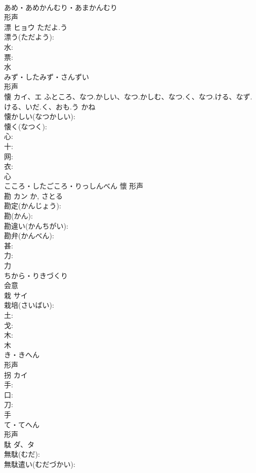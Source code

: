 \documentclass[8pt]{extreport}
\begin{document}
\begin{CJK}{UTF8}{min}
\\	あめ・あめかんむり・あまかんむり	
\\	形声 
\\	漂	ヒョウ	ただよ.う		
\\	漂う(ただよう): 
\\	水: 
\\	票: 
\\	水	
\\	みず・したみず・さんずい	
\\	形声 
\\	懐	カイ、エ	ふところ、なつ.かしい、なつ.かしむ、なつ.く、なつ.ける、なず.ける、いだ.く、おも.う	かね	
\\	懐かしい(なつかしい): 
\\	懐く(なつく): 
\\	心: 
\\	十: 
\\	网: 
\\	衣: 
\\	心	
\\	こころ・したごころ・りっしんべん	懷	形声 
\\	勘	カン		か, さとる	
\\	勘定(かんじょう): 
\\	勘(かん): 
\\	勘違い(かんちがい): 
\\	勘弁(かんべん): 
\\	甚: 
\\	力: 
\\	力	
\\	ちから・りきづくり	
\\	会意 
\\	栽	サイ			
\\	栽培(さいばい): 
\\	土: 
\\	戈: 
\\	木: 
\\	木	
\\	き・きへん	
\\	形声 
\\	拐	カイ			
\\	手: 
\\	口: 
\\	刀: 
\\	手	
\\	て・てへん	
\\	形声 
\\	駄	ダ、タ			
\\	無駄(むだ): 
\\	無駄遣い(むだづかい): 

\end{CJK}
\end{document}
